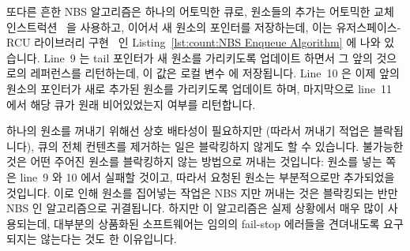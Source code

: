 또다른 흔한 NBS 알고리즘은 하나의 어토믹한 큐로, 원소들의 추가는 어토믹한 교체
인스트럭션~\cite{MagedMichael1993JPDC} 을 사용하고, 이어서 새 원소의
 포인터를 저장하는데, 이는 유저스페이스-RCU 라이브러리
구현~\cite{MathieuDesnoyers2009URCU} 인 Listing~\ref{lst:count:NBS Enqueue
Algorithm} 에 나와 있습니다.
Line~9 는 tail 포인터가 새 원소를 가리키도록 업데이트 하면서 그 앞의 것으로의
레퍼런스를 리턴하는데, 이 값은 로컬 변수  에 저장됩니다.
Line~10 은 이제 앞의 원소의  포인터가 새로 추가된 원소를 가리키도록
업데이트 하며, 마지막으로 line~11 에서 해당 큐가 원래 비어있었는지 여부를
리턴합니다.
\iffalse

Another common NBS algorithm is the atomic queue where elements are
enqueued using an atomic exchange instruction~\cite{MagedMichael1993JPDC},
followed by a store into the \co{->next} pointer of the new element's
predecessor, as shown in
Listing~\ref{lst:count:NBS Enqueue Algorithm},
which shows the userspace-RCU library
implementation~\cite{MathieuDesnoyers2009URCU}.
Line~9 updates the tail pointer to reference the new element while
returning a reference to its predecessor, which is stored in
local variable \co{old_tail}.
Line~10 then updates the predecessor's \co{->next} pointer to
reference the newly added element, and finally line~11
returns an indication as to whether or not the queue was initially
empty.
\fi

하나의 원소를 꺼내기 위해선 상호 배타성이 필요하지만 (따라서 꺼내기 적업은
블락됩니다), 큐의 전체 컨텐츠를 제거하는 일은 블락킹하지 않게도 할 수 있습니다.
불가능한 것은 어떤 주어진 원소를 블락킹하지 않는 방법으로 꺼내는 것입니다:
원소를 넣는 쪽은 line~9 와 10 에서 실패할 것이고, 따라서 요청된 원소는
부분적으로만 추가되었을 것입니다.
이로 인해 원소를 집어넣는 작업은 NBS 지만 꺼내는 것은 블락킹되는 반만 NBS 인
알고리즘으로 귀결됩니다.
하지만 이 알고리즘은 실제 상황에서 매우 많이 사용되는데, 대부분의 상품화된
소프트웨어는 임의의 fail-stop 에러들을 견뎌내도록 요구되지는 않는다는 것도 한
이유입니다.
\iffalse

Although mutual exclusion is required to dequeue a single element
(so that dequeue is blocking), it is possible to carry out a non-blocking
removal of the entire contents of the queue.
What is not possible is to dequeue any given element in a non-blocking
manner: The enqueuer might have failed between lines~9 and~10 of the
listing, so that the element in question is only partially enqueued.
This results in a half-NBS algorithm where enqueues are NBS but
dequeues are blocking.
This algorithm is nevertheless heavily used in practice, in part because
most production software is not required to tolerate arbitrary fail-stop
errors.
\fi


